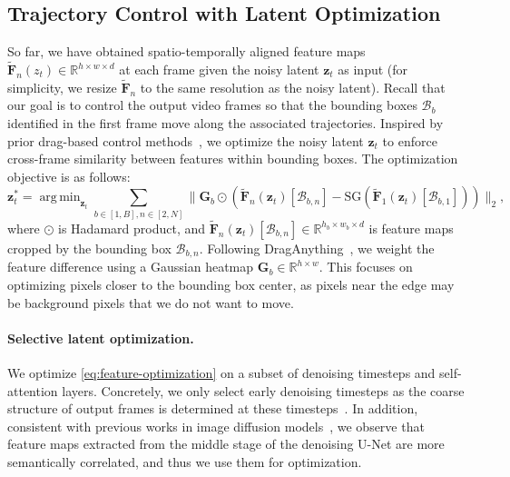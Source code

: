 \documentclass{article} \usepackage{iclr2025_conference,times}
\DeclareMathOperator*{\argmin}{arg\,min}
\begin{document}
\subsection{Trajectory Control with Latent Optimization}
\label{sec:motion_optimization}


So far, we have obtained spatio-temporally aligned feature maps $\tilde{\bm{F}}_n(z_t) \in \mathbb{R}^{h \times w \times d}$ at each frame given the noisy latent $\bm{z}_t$ as input (for simplicity, we resize $\tilde{\bm{F}}_n$ to the same resolution as the noisy latent).
Recall that our goal is to control the output video frames so that the bounding boxes $\mathcal{B}_b$ identified in the first frame move along the associated trajectories.  
Inspired by prior drag-based control methods~\citep{shi2024dragdiffusion,pan2023drag}, we optimize the noisy latent $\bm{z}_t$ to enforce cross-frame similarity between features within bounding boxes. 
The optimization objective is as follows:
\begin{equation}\label{eq:feature-optimization}
    \bm{z}_t^* = \argmin_{\bm{z}_t} \sum_{b\in[1, B], n\in[2, N]}\lVert \bm{G}_{b} \odot \left(\tilde{\bm{F}}_n(\bm{z}_t)[\mathcal{B}_{b, n}] - \mathrm{SG}(\tilde{\bm{F}}_1(\bm{z}_t)[\mathcal{B}_{b, 1}])\right) \rVert_2,
\end{equation}
where $\odot$ is Hadamard product, and $\tilde{\bm{F}}_n(\bm{z}_t)[\mathcal{B}_{b, n}] \in \mathbb{R}^{h_b \times w_b \times d}$ is feature maps cropped by the bounding box $\mathcal{B}_{b, n}$. 
Following DragAnything~\citep{wu2024draganything}, we weight the feature difference using a Gaussian heatmap $\bm{G}_{b} \in \mathbb{R}^{h \times w}$. This focuses on optimizing pixels closer to the bounding box center, as pixels near the edge may be background pixels that we do not want to move. 
\vspace{-2.5mm}
\paragraph{Selective latent optimization.}
We optimize \cref{eq:feature-optimization} on a subset of denoising timesteps and self-attention layers.
Concretely, we only select early denoising timesteps as the coarse structure of output frames is determined at these timesteps~\citep{DMProcessAnalyze,materzynska2023customizing}.
In addition, consistent with previous works in image diffusion models~\citep{shi2024dragdiffusion,mou2023dragondiffusion}, we observe that feature maps extracted from the middle stage of the denoising U-Net are more semantically correlated, and thus we use them for optimization.
\end{document}
